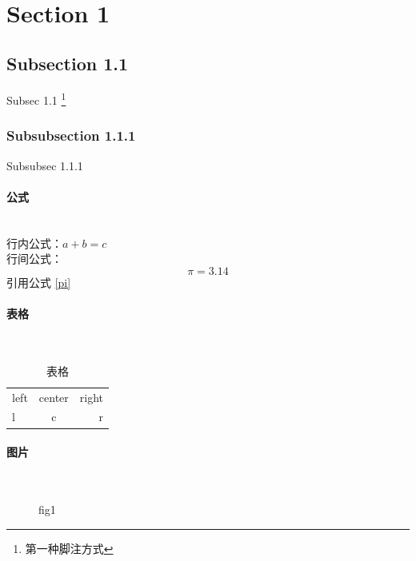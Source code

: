 \documentclass[UTF8, a4paper]{ctexart}
\begin{document}
\newpage
\ \\[50pt]
\begin{spacing}{2}
    \tableofcontents    %
\end{spacing}
\newpage
\section{Section 1} \label{sec1}
\subsection{Subsection 1.1}
Subsec 1.1  \footnote{第一种脚注方式}
\subsubsection{Subsubsection 1.1.1}
Subsubsec 1.1.1 \footnotemark
{}

\paragraph{公式}~{}\\
行内公式：$a+b=c$\\
行间公式：
\begin{equation}
    \label{pi}
    \pi=3.14 \tag{1} 
\end{equation}
引用公式 \eqref{pi}

\paragraph{表格}~{}
\begin{table}[!htbp]
    \caption{表格}
    \centering
    \begin{tabular}{|l|c|r|}    %
        \hline
        left & center & right \\
        l & c & r\\
        \hline
    \end{tabular}
\end{table}

\paragraph{图片}~{}
\begin{figure}[!htbp]
    \centering  %
    \begin{minipage}{10em}
        \centering
        \caption{fig1}    
    \end{minipage}
\end{figure}
\end{document}
